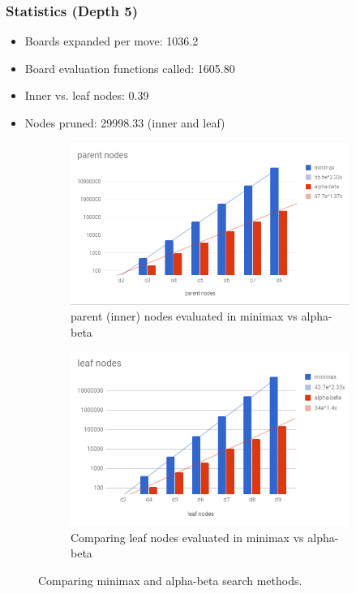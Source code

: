 \documentclass{article}
\begin{document}
\subsubsection{Statistics (Depth 5)}
\begin{itemize}
	\item Boards expanded per move: 1036.2
	\item Board evaluation functions called: 1605.80
	\item Inner vs. leaf nodes: 0.39
    \item Nodes pruned: 29998.33 (inner and leaf)
\end{itemize}

\begin{figure}[ht!]
    \centering
    \begin{subfigure}[b]{0.4\linewidth}
        \includegraphics[width=\linewidth]{images/parent-nodes-abvmm.png}
        \caption{parent (inner) nodes evaluated in minimax vs alpha-beta}
    \end{subfigure}
    \begin{subfigure}[b]{0.4\linewidth}
        \includegraphics[width=\linewidth]{images/leaf-nodes-abvmm.png}
        \caption{Comparing leaf nodes evaluated in minimax vs alpha-beta}
    \end{subfigure}

    \caption{Comparing minimax and alpha-beta search methods.}
    \label{fig:ab-v-mm}
\end{figure}
\end{document}
